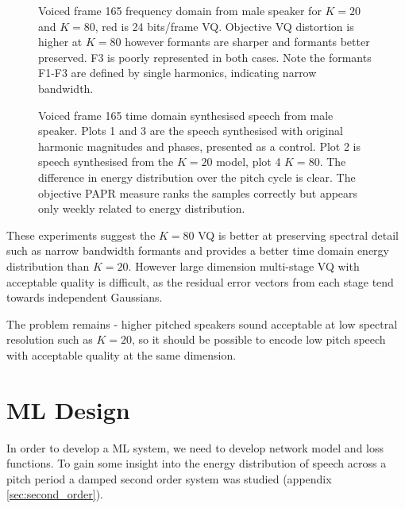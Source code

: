 \documentclass{article}
\begin{document}
\begin{figure}
\caption{Voiced frame 165 frequency domain from male speaker for $K=20$ and $K=80$, red is 24 bits/frame VQ. Objective VQ distortion is higher at $K=80$ however formants are sharper and formants better preserved.  F3 is poorly represented in both cases.  Note the formants F1-F3 are defined by single harmonics, indicating narrow bandwidth.}
\label{fig:big_dog_f165_freq}
\begin{center}


\end{center}
\end{figure}

\begin{figure}
\caption{Voiced frame 165 time domain synthesised speech from male speaker.  Plots 1 and 3 are the speech synthesised with original harmonic magnitudes and phases, presented as a control.  Plot 2 is speech synthesised from the $K=20$ model, plot 4 $K=80$. The difference in energy distribution over the pitch cycle is clear.  The objective PAPR measure ranks the samples correctly but appears only weekly related to energy distribution.}
\label{fig:big_dog_f165_time}
\begin{center}


\end{center}
\end{figure}

These experiments suggest the $K=80$ VQ is better at preserving spectral detail such as narrow bandwidth formants and provides a better time domain energy distribution than $K=20$.  However large dimension multi-stage VQ with acceptable quality is difficult, as the residual error vectors from each stage tend towards independent Gaussians.

The problem remains - higher pitched speakers sound acceptable at low spectral resolution such as $K=20$, so it should be possible to encode low pitch speech with acceptable quality at the same dimension.

\section{ML Design}

In order to develop a ML system, we need to develop network model and loss functions. To gain some insight into the energy distribution of speech across a pitch period a damped second order system was studied (appendix \ref{sec:second_order}).
\end{document}
